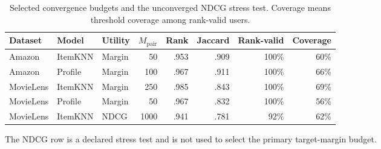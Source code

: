 \begin{table}[!htbp]
\centering\scriptsize
\setlength{\tabcolsep}{3pt}
\caption{Selected convergence budgets and the unconverged NDCG stress test. Coverage means threshold coverage among rank-valid users.}
\label{tab:app-convergence}
\begin{tabular}{@{}lllrrrrr@{}}
\toprule
Dataset & Model & Utility & $M_{\mathrm{pair}}$ & Rank & Jaccard & Rank-valid & Coverage \\
\midrule
Amazon & ItemKNN & Margin & 50 & .953 & .909 & 100\% & 60\% \\
Amazon & Profile & Margin & 100 & .967 & .911 & 100\% & 66\% \\
MovieLens & ItemKNN & Margin & 250 & .985 & .843 & 100\% & 69\% \\
MovieLens & Profile & Margin & 50 & .967 & .832 & 100\% & 56\% \\
MovieLens & ItemKNN & NDCG & 1000 & .941 & .781 & 92\% & 62\% \\
\bottomrule
\end{tabular}
\end{table}

\noindent The NDCG row is a declared stress test and is not used to select the primary target-margin budget.